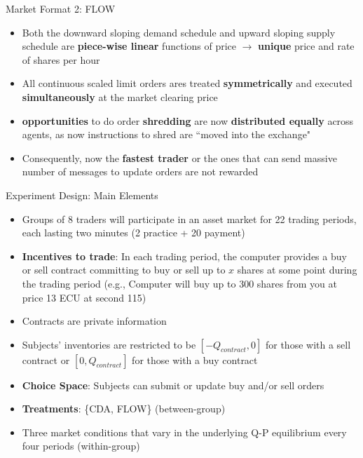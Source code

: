\documentclass[10pt]{beamer}
\begin{document}
\begin{frame}{Market Format 2: FLOW}
    \begin{itemize}
        \item Both the downward sloping demand schedule and upward sloping supply schedule are \textbf{piece-wise linear} functions of price $\rightarrow$ \textbf{unique} price and rate of shares per hour
        \item All continuous scaled limit orders ares treated \textbf{symmetrically} and executed \textbf{simultaneously} at the market clearing price
        \item \textbf{opportunities} to do order \textbf{shredding} are now \textbf{distributed equally} across agents, as now instructions to shred are ``moved into the exchange"
        \item Consequently, now the \textbf{fastest trader} or the ones that can send massive number of messages to update orders are not rewarded
    \end{itemize}
\end{frame}

\begin{frame}{Experiment Design: Main Elements}
    \begin{itemize}
        \item Groups of 8 traders will participate in an asset market for 22 trading periods, each lasting two minutes (2 practice + 20 payment)
        \item \textbf{Incentives to trade}: In each trading period, the computer provides a buy or sell contract committing to buy or sell up to $x$ shares at some point during the trading period (e.g., Computer will buy up to 300 shares from you at price 13 ECU at second 115)
        \item Contracts are private information
        \item Subjects' inventories are restricted to be $[-Q_{contract}, 0]$ for those with a sell contract or $[0, Q_{contract}]$ for those with a buy contract
        \item \textbf{Choice Space}: Subjects can submit or update buy and/or sell orders
        \item \textbf{Treatments}: \{CDA, FLOW\} (between-group)
        \item Three market conditions that vary in the underlying Q-P equilibrium every four periods (within-group)
    \end{itemize}
\end{frame}
\end{document}
